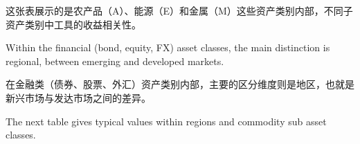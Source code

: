 \begin{chineseblock}这张表展示的是农产品（A）、能源（E）和金属（M）这些资产类别内部，不同子资产类别中工具的收益相关性。\end{chineseblock}

\bipairgap

\begin{englishblock} Within the financial (bond, equity, FX) asset classes, the main distinction is regional, between emerging and developed markets. \end{englishblock}

\begin{chineseblock}在金融类（债券、股票、外汇）资产类别内部，主要的区分维度则是地区，也就是新兴市场与发达市场之间的差异。\end{chineseblock}

\begin{bilingualtableblock} 
\end{bilingualtableblock}

\begin{englishblock} The next table gives typical values within regions and commodity sub asset classes. \end{englishblock}

